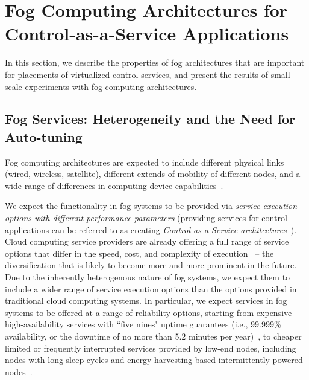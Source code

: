 \documentclass[10pt, journal, letterpaper]{IEEEtran}
\newcommand{\1}{\ensuremath{\mathbf{1}}} %
\begin{document}
\section{Fog Computing Architectures for Control-as-a-Service Applications \label{Section: Architectures}}

\par
In this section, we describe the properties of fog architectures that are important for placements of virtualized control services, and present the results of small-scale experiments with fog computing architectures.

\subsection{Fog Services: Heterogeneity and the Need for Auto-tuning}

\par 
Fog computing architectures are expected to include different physical links (wired, wireless, satellite), different extends of mobility of different nodes, and a wide range of differences in computing device capabilities~\cite{OpenFogReferenceArchitecture2017}.

\par
We expect the functionality in fog systems to be provided via \emph{service execution options with different performance parameters} (providing services for control applications can be referred to as creating \emph{Control-as-a-Service architectures}~\cite{Esen15_ControlAsService,Qi2016Design}). Cloud computing service providers are already offering a full range of service options that differ in the speed, cost, and complexity of execution~\cite{EC2InstanceTypes,AmazonLambda} -- the diversification that is likely to become more and more prominent in the future. %
Due to the inherently heterogenous nature of fog systems, 
we expect them to include a wider range of service execution options than the options provided in traditional cloud computing systems. In particular, we expect services in fog systems to be offered at a range of reliability options, starting from expensive high-availability services with ``five nines" uptime guarantees (i.e., 99.999\% availability, or the downtime of no more than 5.2 minutes per year)~\cite{Brewer2001Lessons}, to cheaper limited or frequently interrupted services provided by low-end nodes, including nodes with long sleep cycles 
and energy-harvesting-based intermittently powered nodes~\cite{Margolies2015EnHANTs,lucia2017Intermittent}.
\end{document}
